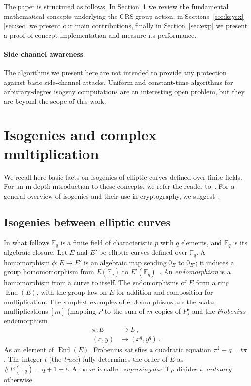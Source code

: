 \documentclass{llncs}
\newcommand{\F}{\mathbb{F}}
\newcommand{\Fbar}{\overline{\mathbb{F}}}
\DeclareMathOperator{\End}{End}
\begin{document}
The paper is structured as follows. In Section~\ref{sec:math} we
review the fundamental mathematical concepts underlying the CRS group
action, in Sections~\ref{sec:keyex}--\ref{sec:sec} we present our main
contributions, finally in Section~\ref{sec:exp} we present a
proof-of-concept implementation and measure its performance.

\paragraph{Side channel awareness.}
The algorithms we present here are not intended to provide any protection
against basic side-channel attacks.  
Uniform and constant-time algorithms for arbitrary-degree isogeny computations
are an interesting open problem,
but they are beyond the scope of this work.

\section{Isogenies and complex multiplication}
\label{sec:math}

We recall here basic facts on isogenies of elliptic curves defined
over finite fields. For an in-depth introduction to these concepts, we
refer the reader to~\cite{silverman:elliptic}. For a general
overview of isogenies and their use in cryptography, we
suggest~\cite{defeo2017isogenybased}.

\subsection{Isogenies between elliptic curves}
\label{sec:isogeny}

In what follows $\F_q$ is a finite field of characteristic $p$ with
$q$ elements, and $\Fbar_q$ is its algebraic closure. Let $E$ and $E'$
be elliptic curves defined over $\F_q$. 
A homomorphism $ϕ:E→E'$ is an
algebraic map sending $0_E$ to $0_{E'}$;
it induces a group homomomorphism from
$E(\Fbar_q)$ to $E'(\Fbar_q)$~\cite[III.4]{silverman:elliptic}.
An \emph{endomorphism} is a homomorphism from a curve to itself.
The endomorphisms of $E$ form a ring $\End(E)$,
with the group law on $E$ for addition
and composition for multiplication.
The simplest examples of endomorphisms
are the scalar multiplications $[m]$
(mapping $P$ to the sum of $m$ copies of $P$)
and the \emph{Frobenius} endomorphism
\begin{align*}
  π : E &\longrightarrow E \,, \\
  (x,y) &\longmapsto (x^q,y^q) \,.
\end{align*}
As an element of $\End(E)$, Frobenius satisfies a quadratic equation
$π^2 + q = tπ$.  The integer $t$ (the \emph{trace})
fully determines the order of $E$ as $\#E(\F_q)=q+1-t$. A curve is
called \emph{supersingular} if $p$ divides $t$, \emph{ordinary}
otherwise.
\end{document}
